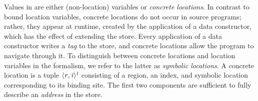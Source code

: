 \documentclass[showabstract,showacknowledgments,showpreface,showdedication]{iuphd}
\theoremstyle{nonumberplain}
\begin{document}
Values in \ourcalc{} are either (non-location) variables or
\emph{concrete locations}.
%
In contrast to bound location variables, concrete locations
do not occur in source programs; rather, they appear at runtime, created by the
application of a data constructor, which has the effect of
extending the store.
%
Every application of a data constructor writes a \emph{tag} to the store, and
concrete locations allow the program to navigate through it.
%
To distinguish between concrete locations and location variables in
the formalism, we refer to the latter as \emph{symbolic locations}.
%
A concrete location is a tuple
$\langle \mathit{r}, \mathit{i} \rangle ^{\mathit{l}}$ consisting of a region, an index, and
symbolic location corresponding to its binding site.
%
The first two components are sufficient to fully describe
an \emph{address} in the store.

%
%
\end{document}
